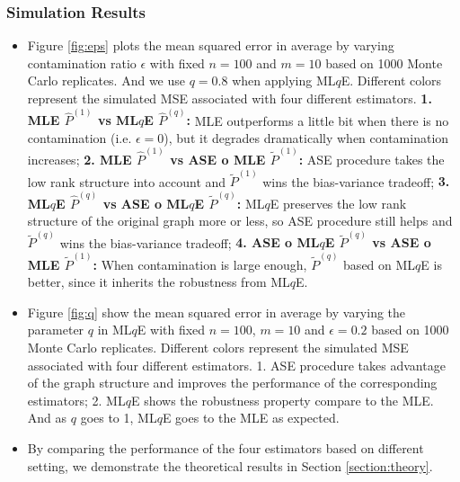 \documentclass[a4paper]{article}
\begin{document}
\subsubsection{Simulation Results}
\begin{itemize}
\item Figure \ref{fig:eps} plots the mean squared error in average by varying contamination ratio $\epsilon$ with fixed $n = 100$ and $m = 10$ based on 1000 Monte Carlo replicates. And we use $q=0.8$ when applying ML$q$E.
Different colors represent the simulated MSE associated with four different estimators.
\textbf{1. MLE $\hat{P}^{(1)}$ vs ML$q$E $\hat{P}^{(q)}$:}
MLE outperforms a little bit when there is no contamination (i.e. $\epsilon = 0$), but it degrades dramatically when contamination increases;
\textbf{2. MLE $\hat{P}^{(1)}$ vs ASE o MLE $\widetilde{P}^{(1)}$: }
ASE procedure takes the low rank structure into account and $\widetilde{P}^{(1)}$ wins the bias-variance tradeoff;
\textbf{3. ML$q$E $\hat{P}^{(q)}$ vs ASE o ML$q$E $\widetilde{P}^{(q)}$: }
ML$q$E preserves the low rank structure of the original graph more or less, so ASE procedure still helps and $\widetilde{P}^{(q)}$ wins the bias-variance tradeoff;
\textbf{4. ASE o ML$q$E $\widetilde{P}^{(q)}$ vs ASE o MLE $\widetilde{P}^{(1)}$: }
When contamination is large enough, $\widetilde{P}^{(q)}$ based on ML$q$E is better, since it inherits the robustness from ML$q$E.
\item Figure \ref{fig:q} show the mean squared error in average by varying the parameter $q$ in ML$q$E with fixed $n = 100$, $m = 10$ and $\epsilon = 0.2$ based on 1000 Monte Carlo replicates. Different colors represent the simulated MSE associated with four different estimators.
1. ASE procedure takes advantage of the graph structure and improves the performance of the corresponding estimators;
2. ML$q$E shows the robustness property compare to the MLE. And as $q$ goes to 1, ML$q$E goes to the MLE as expected.
\item By comparing the performance of the four estimators based on different setting, we demonstrate the theoretical results in Section \ref{section:theory}.
\end{itemize}
\end{document}

